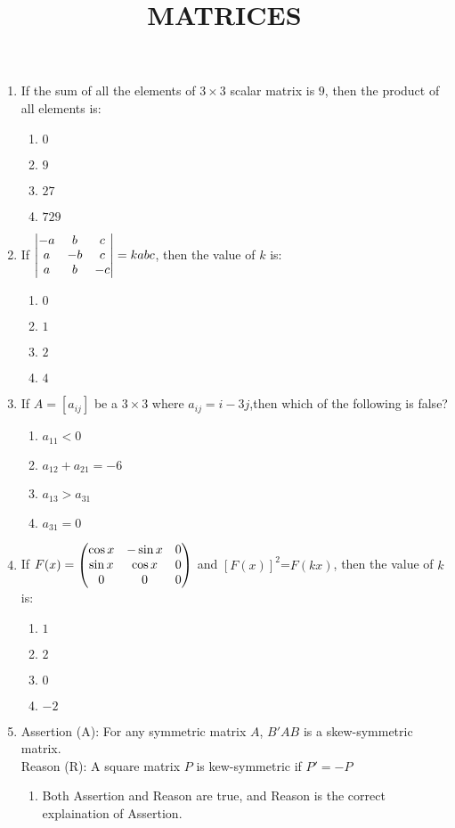 \documentclass{article}
\begin{document}
\title{MATRICES}
\begin{enumerate}
    \item If the sum of all the elements of $3 \times 3$ scalar matrix is $9$, then the product of all elements is:
	    \begin{enumerate}
		    \item $0$
		    \item $9$
		    \item $27$
		    \item $729$
	    \end{enumerate}
    \item If $ \begin{vmatrix}-a & b & c\\a & -b & c\\a & b & -c\end{vmatrix} = kabc$, then the value of $k$ is:
	    \begin{enumerate}
		    \item $0$
		    \item $1$
		    \item $2$
		    \item $4$
	    \end{enumerate}
    \item If $A=[a_{ij}]$ be a $3 \times 3$ where $a_{ij} = i - 3j$,then which of the following is false?
	    \begin{enumerate}
		    \item $a_{11}<0$
		    \item $a_{12} +a_{21} = -6$
		    \item $a_{13}>a_{31}$
		    \item $a_{31}=0$
	    \end{enumerate}
    \item If $F(x)= \begin{pmatrix}\cos x & -\sin x & 0\\ \sin x & \cos x & 0\\ 0 & 0 &0\end{pmatrix}$ and $[F(x)]^2$=$F(kx)$, then the value of $k$ is:
	    \begin{enumerate}
		    \item $1$
		    \item $2$
		    \item $0$
		    \item $-2$
	    \end{enumerate}
    \item Assertion (A): For any symmetric matrix $A$, $B'AB$ is a skew-symmetric matrix.\\
	  Reason (R): A square matrix $P$ is kew-symmetric if $P'=-P$
		\begin{enumerate}
			\item Both Assertion and Reason are true, and Reason is the correct explaination of Assertion.

\end{enumerate}
\end{enumerate}
\end{document}
